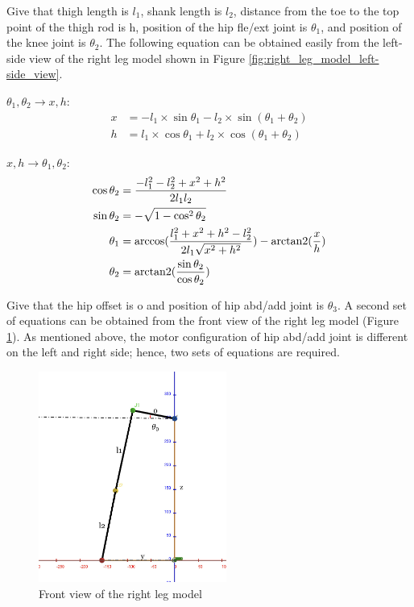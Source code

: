 Give that thigh length is $l_1$, shank length is $l_2$, distance from the toe to the top point of the thigh rod is h, position of the hip fle/ext joint is $\theta_1$, and position of the knee joint is $\theta_2$. The following equation can be obtained easily from the left-side view of the right leg model shown in Figure \ref{fig:right_leg_model_left-side_view}.

$\theta_1, \theta_2 \rightarrow x, h$:
\begin{align*}
x &= -l_1 \times \sin\theta_1 - l_2 \times \sin(\theta_1 + \theta_2) \\
h &=  l_1 \times \cos\theta_1 + l_2 \times \cos(\theta_1 + \theta_2)
\end{align*}

$x, h \rightarrow \theta_1, \theta_2$:
\begin{align*}
\cos\theta_2 &= \frac{-l_1^2 - l_2^2 + x^2 + h^2}{2 l_1 l_2} \\
\sin\theta_2 &= -\sqrt{1 - \cos^2\theta_2} \\
\theta_1 &= \arccos(\frac{l_1^2 + x^2 + h^2 - l_2^2}{2 l_1 \sqrt{x^2 + h^2}}) - \operatorname{arctan2}(\frac{x}{h}) \\
\theta_2 &= \operatorname{arctan2}(\frac{\sin\theta_2}{\cos\theta_2})
\end{align*}

Give that the hip offset is o and position of hip abd/add joint is $\theta_3$. A second set of equations can be obtained from the front view of the right leg model (Figure \ref{fig:right_leg_model_front_view}). As mentioned above, the motor configuration of hip abd/add joint is different on the left and right side; hence, two sets of equations are required.

\begin{figure}[htbp]
   \centering
   \includegraphics[width=0.55\textwidth]{figures/right_leg_model_front_view.jpg}
   \caption{Front view of the right leg model}
   \label{fig:right_leg_model_front_view}
\end{figure}

